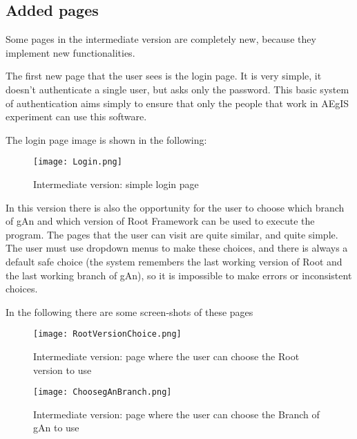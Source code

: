 \subsection{Added pages}

Some pages in the intermediate version are completely new, because they implement new functionalities.

The first new page that the user sees is the login page. It is very simple, it doesn't authenticate a single user, but asks only the password. This basic system of authentication aims simply to ensure that only the people that work in AEgIS experiment can use this software.

The login page image is shown in the following:

\begin{figure}[H]
\centering
\texttt{[image: Login.png]} 
\caption{Intermediate version: simple login page}
\end{figure}

In this version there is also the opportunity for the user to choose which branch of gAn and which version of Root Framework can be used to execute the program. The pages that the user can visit are quite similar, and quite simple. The user must use dropdown menus to make these choices, and there is always a default safe choice (the system remembers the last working version of Root and the last working branch of gAn), so it is impossible to make errors or inconsistent choices. 

In the following there are some screen-shots of these pages

\begin{figure}[H]
\centering
\texttt{[image: RootVersionChoice.png]} 
\caption{Intermediate version: page where the user can choose the Root version to use}
\end{figure}
 
 
\begin{figure}[H]
\centering
\texttt{[image: ChoosegAnBranch.png]} 
\caption{Intermediate version: page where the user can choose the Branch of gAn to use}
\end{figure}
